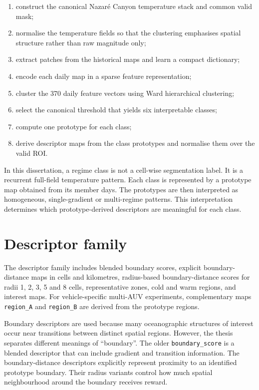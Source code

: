 \begin{enumerate}
    \item construct the canonical Nazar\'e Canyon temperature stack and common valid mask;
    \item normalise the temperature fields so that the clustering emphasises spatial structure rather than raw magnitude only;
    \item extract patches from the historical maps and learn a compact dictionary;
    \item encode each daily map in a sparse feature representation;
    \item cluster the 370 daily feature vectors using Ward hierarchical clustering;
    \item select the canonical threshold that yields six interpretable classes;
    \item compute one prototype for each class;
    \item derive descriptor maps from the class prototypes and normalise them over the valid ROI.
\end{enumerate}

In this dissertation, a regime class is not a cell-wise segmentation label. It is a recurrent full-field temperature pattern. Each class is represented by a prototype map obtained from its member days. The prototypes are then interpreted as homogeneous, single-gradient or multi-regime patterns. This interpretation determines which prototype-derived descriptors are meaningful for each class.

\section{Descriptor family}

The descriptor family includes blended boundary scores, explicit boundary-distance maps in cells and kilometres, radius-based boundary-distance scores for radii 1, 2, 3, 5 and 8 cells, representative zones, cold and warm regions, and interest maps. For vehicle-specific multi-AUV experiments, complementary maps \texttt{region\_A} and \texttt{region\_B} are derived from the prototype regions.

Boundary descriptors are used because many oceanographic structures of interest occur near transitions between distinct spatial regions. However, the thesis separates different meanings of ``boundary''. The older \texttt{boundary\_score} is a blended descriptor that can include gradient and transition information. The boundary-distance descriptors explicitly represent proximity to an identified prototype boundary. Their radius variants control how much spatial neighbourhood around the boundary receives reward.

